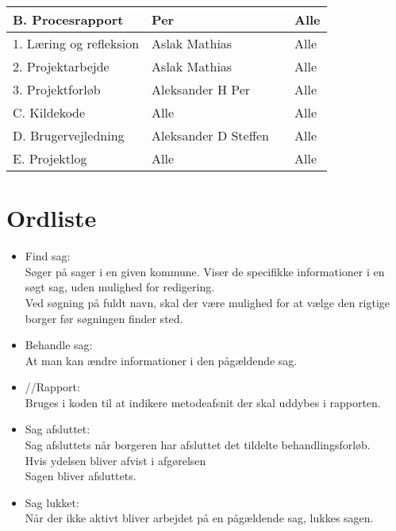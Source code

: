 \begin{center}
\begin{longtable}{|m{5.8cm}|m{3.5cm}|m{3.5cm}|m{3.2cm}|}
B. Procesrapport & Per & & Alle\\ \hline
1. Læring og refleksion & Aslak \newline Mathias & & Alle\\ \hline
2. Projektarbejde &  Aslak \newline Mathias & & Alle\\ \hline
3. Projektforløb & Aleksander H \newline Per & & Alle\\ \hline

C. Kildekode & Alle & & Alle\\ \hline

D. Brugervejledning & Aleksander D \newline Steffen & & Alle\\ \hline

E. Projektlog & Alle & & Alle\\ \hline


\end{longtable}
\end{center}

\section{Ordliste}\label{sec:ordliste}

\begin{itemize}
\renewcommand\labelitemi{--}
\item Find sag: \\
Søger på sager i en given kommune. Viser de specifikke informationer i en søgt sag, uden mulighed for redigering. \\
Ved søgning på fuldt navn, skal der være mulighed for at vælge den rigtige borger før søgningen finder sted.
\item Behandle sag: \\
At man kan ændre informationer i den pågældende sag.
\item //Rapport: \\
Bruges i koden til at indikere metodeafsnit der skal uddybes i rapporten.
\item Sag afsluttet: \\
Sag afsluttets når borgeren har afsluttet det tildelte behandlingsforløb. \\
Hvis ydelsen bliver afvist i afgørelsen \\
Sagen bliver afsluttets.
\item Sag lukket: \\
Når der ikke aktivt bliver arbejdet på en pågældende sag, lukkes sagen.
\end{itemize}

